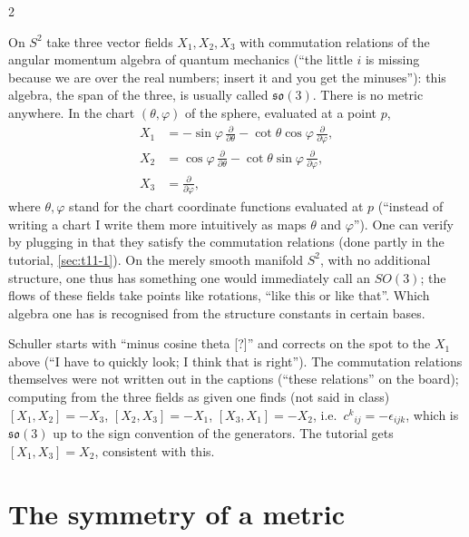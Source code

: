 \begin{paracol}{2}
\begin{example}\label{ex:c11-so3}
On $S^2$ take three vector fields $X_1,X_2,X_3$ with commutation relations of the angular momentum algebra of quantum mechanics (``the little $i$ is missing because we are over the real numbers; insert it and you get the minuses''): this algebra, the span of the three, is usually called $\mathfrak{so}(3)$. There is no metric anywhere. In the chart $(\theta,\varphi)$ of the sphere, evaluated at a point $p$,
\begin{align*}
  X_1&=-\sin\varphi\,\frac{\partial}{\partial\theta}-\cot\theta\cos\varphi\,\frac{\partial}{\partial\varphi},\\
  X_2&=\cos\varphi\,\frac{\partial}{\partial\theta}-\cot\theta\sin\varphi\,\frac{\partial}{\partial\varphi},\\
  X_3&=\frac{\partial}{\partial\varphi},
\end{align*}
where $\theta,\varphi$ stand for the chart coordinate functions evaluated at $p$ (``instead of writing a chart I write them more intuitively as maps $\theta$ and $\varphi$''). One can verify by plugging in that they satisfy the commutation relations (done partly in the tutorial, \cref{sec:t11-1}). On the merely smooth manifold $S^2$, with no additional structure, one thus has something one would immediately call an $SO(3)$; the flows of these fields take points like rotations, ``like this or like that''. Which algebra one has is recognised from the structure constants in certain bases.
\end{example}
\begin{coursenote}
Schuller starts with ``minus cosine theta [?]'' and corrects on the spot to the $X_1$ above (``I have to quickly look; I think that is right''). The commutation relations themselves were not written out in the captions (``these relations'' on the board); computing from the three fields as given one finds (not said in class) $[X_1,X_2]=-X_3$, $[X_2,X_3]=-X_1$, $[X_3,X_1]=-X_2$, i.e.\ $c^k{}_{ij}=-\epsilon_{ijk}$, which is $\mathfrak{so}(3)$ up to the sign convention of the generators. The tutorial gets $[X_1,X_3]=X_2$, consistent with this.
\end{coursenote}

\section{The symmetry of a metric}\label{sec:c11-symmetry}


\end{paracol}
